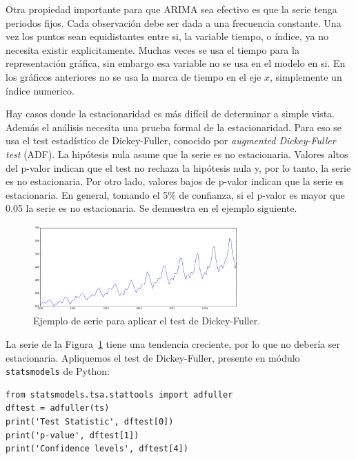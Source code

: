 \documentclass[11pt,spanish,listoffigures,listoftables]{tfgetsinf}
\begin{document}
    Otra propiedad importante para que ARIMA sea efectivo es que la serie tenga periodos fijos. Cada observación debe ser dada a una frecuencia constante. Una vez los puntos sean equidistantes entre si, la variable tiempo, o índice, ya no necesita existir explicitamente. Muchas veces se usa el tiempo para la representación gráfica, sin embargo esa variable no se usa en el modelo en si. En los gráficos anteriores no se usa la marca de tiempo en el eje \(x\), simplemente un índice numerico. 
    
    Hay casos donde la estacionaridad es más difícil de determinar a simple vista. Además el análisis necesita una prueba formal de la estacionaridad. Para eso se usa el test estadístico de Dickey-Fuller, conocido por {\em augmented Dickey-Fuller test} (ADF). La hipótesis nula asume que la serie es no estacionaria. Valores altos del p-valor indican que el test no rechaza la hipótesis nula y, por lo tanto, la serie es no estacionaria. Por otro lado, valores bajos de p-valor indican que la serie es estacionaria. En general, tomando el 5\% de confianza, si el p-valor es mayor que 0.05 la serie es no estacionaria. Se demuestra en el ejemplo siguiente.
    
    
    \begin{figure}[h]
        \centering
        \includegraphics[width=0.7\textwidth]{time_serie_1.png}
        \caption{Ejemplo de serie para aplicar el test de Dickey-Fuller.}
        \label{fig:time_serie_1}
    \end{figure}
    
    La serie de la Figura~\ref{fig:time_serie_1} tiene una tendencia creciente, por lo que no debería ser estacionaria. Apliquemos el test de Dickey-Fuller, presente en módulo {\tt statsmodels} de Python:
    
    \lstset{style=python}
    \begin{lstlisting}[caption=Test de Dickey-Fuller de {\tt statsmodels} de Python., label={lst:adf_test_1}]
from statsmodels.tsa.stattools import adfuller
dftest = adfuller(ts)
print('Test Statistic', dftest[0])
print('p-value', dftest[1])
print('Confidence levels', dftest[4])  
    \end{lstlisting}
    
\end{document}
